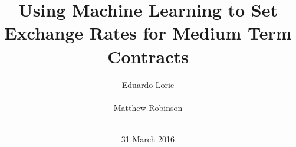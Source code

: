 \documentclass{sig-alternate-05-2015}
\begin{document}


\title{{Using Machine Learning to Set Exchange Rates for Medium Term Contracts}
}
\author{
\alignauthor
Eduardo Lorie\\
       \\
\alignauthor 
Matthew Robinson \\
       \\
}

\date{31 March 2016}

\maketitle
\end{document}
